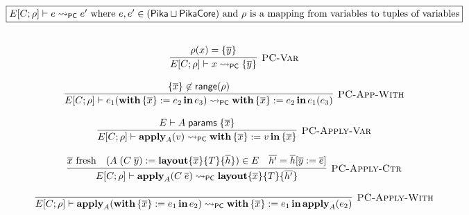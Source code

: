 \[
  \begin{array}{c}
    \fbox{$E[C;\rho] \vdash e \pcNotionStep e'\textrm{ where $e, e' \in (\Pika \sqcup \PikaCore)$ and $\rho$ is a mapping from variables to tuples of variables}$}
    \fboxNewlines
    \labinfer[PC-Var]{E[C;\rho] \vdash x \pcNotionStep \{\overline{y}\}}
      {\rho(x) = \{\overline{y}\}}
    \\\\
    \labinfer[PC-App-With]{E[C;\rho] \vdash e_1 (\withIn{ \{ \overline{x} \} := e_2}{e_3}) \pcNotionStep \withIn{\{ \overline{x} \} := e_2}{e_1(e_3)}}
      {\{\overline{x}\} \not\in \range(\rho)}
    \\\\
    \labinfer[PC-Apply-Var]{E[C;\rho] \vdash \apply_A(v) \pcNotionStep \withIn{ \{ \overline{x} \} := v}{\{ \overline{x} \}}}
      {E \vdash A\; \layoutParams\; \{\overline{x}\}
      }
    \\\\
    \labinfer[PC-Apply-Ctr]{E[C;\rho] \vdash \apply_A(C\; \overline{e}) \pcNotionStep \sslmath{\overline{x}}{T}{\overline{h'}}}
      {\fresh{\overline{x}}
      & (A\; (C\; \overline{y}) := \sslmath{\overline{x}}{T}{\overline{h}}) \in E
      & \overline{h'} = \overline{h}[\overline{y} := \overline{e}]
      }
    \\\\
    \labinfer[PC-Apply-With]{E[C;\rho] \vdash \apply_A(\withIn{ \{ \overline{x} \} := e_1}{e_2}) \pcNotionStep \withIn{\{ \overline{x} \} := e_1}{\apply_A(e_2)}}
      {}




\end{array}\]
